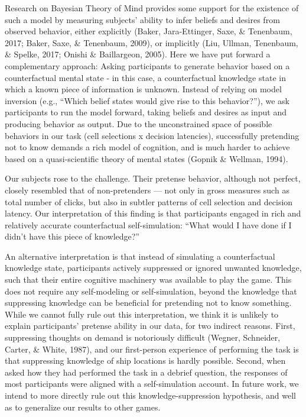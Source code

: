\documentclass[10pt, letterpaper]{article}
\begin{document}
Research on Bayesian Theory of Mind provides some support for the
existence of such a model by measuring subjects' ability to infer
beliefs and desires from observed behavior, either explicitly (Baker,
Jara-Ettinger, Saxe, \& Tenenbaum, 2017; Baker, Saxe, \& Tenenbaum,
2009), or implicitly (Liu, Ullman, Tenenbaum, \& Spelke, 2017; Onishi \&
Baillargeon, 2005). Here we have put forward a complementary approach:
Asking participants to generate behavior based on a counterfactual
mental state - in this case, a counterfactual knowledge state in which a
known piece of information is unknown. Instead of relying on model
inversion (e.g., ``Which belief states would give rise to this
behavior?''), we ask participants to run the model forward, taking
beliefs and desires as input and producing behavior as output. Due to
the unconstrained space of possible behaviors in our task (cell
selections x decision latencies), successfully pretending not to know
demands a rich model of cognition, and is much harder to achieve based
on a quasi-scientific theory of mental states (Gopnik \& Wellman, 1994).

Our subjects rose to the challenge. Their pretense behavior, although
not perfect, closely resembled that of non-pretenders --- not only in
gross measures such as total number of clicks, but also in subtler
patterns of cell selection and decision latency. Our interpretation of
this finding is that participants engaged in rich and relatively
accurate counterfactual self-simulation: ``What would I have done if I
didn't have this piece of knowledge?''

An alternative interpretation is that instead of simulating a
counterfactual knowledge state, participants actively suppressed or
ignored unwanted knowledge, such that their entire cognitive machinery
was available to play the game. This does not require any self-modeling
or self-simulation, beyond the knowledge that suppressing knowledge can
be beneficial for pretending not to know something. While we cannot
fully rule out this interpretation, we think it is unlikely to explain
participants' pretense ability in our data, for two indirect reasons.
First, suppressing thoughts on demand is notoriously difficult (Wegner,
Schneider, Carter, \& White, 1987), and our first-person experience of
performing the task is that suppressing knowledge of ship locations is
hardly possible. Second, when asked how they had performed the task in a
debrief question, the responses of most participants were aligned with a
self-simulation account. In future work, we intend to more directly rule
out this knowledge-suppression hypothesis, and well as to generalize our
results to other games.
\end{document}
